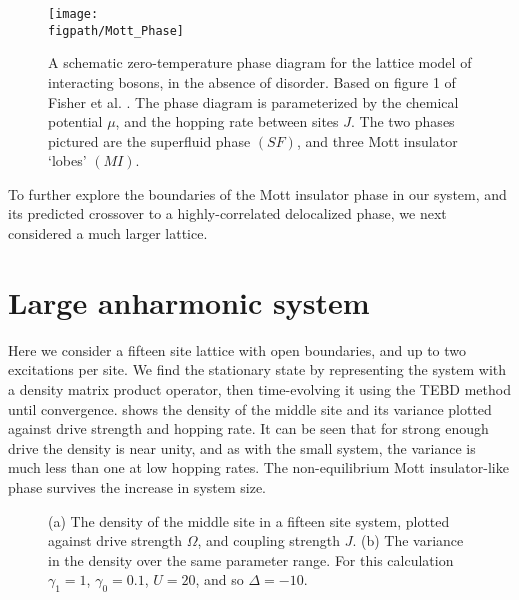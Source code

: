 \begin{figure}[ht]
	\texttt{[image: \\figpath/Mott\_Phase]}
	\caption{\label{fig:dnlca3-2}A schematic zero-temperature phase diagram for the lattice model of interacting bosons, in the absence of disorder. Based on figure 1 of Fisher et al. \cite{Fisher1989}. The phase diagram is parameterized by the chemical potential \(\mu\), and the hopping rate between sites \(J\). The two phases pictured are the superfluid phase \((SF)\), and three Mott insulator `lobes' \((MI)\).}
\end{figure}

To further explore the boundaries of the Mott insulator phase in our system, and its predicted crossover to a highly-correlated delocalized phase, we next considered a much larger lattice.

\section{Large anharmonic system}

Here we consider a fifteen site lattice with open boundaries, and up to two excitations per site. We find the stationary state by representing the system with a density matrix product operator, then time-evolving it using the TEBD method \cite{Vidal2004} until convergence.  shows the density of the middle site and its variance plotted against drive strength and hopping rate. It can be seen that for strong enough drive the density is near unity, and as with the small system, the variance is much less than one at low hopping rates. The non-equilibrium Mott insulator-like phase survives the increase in system size.

\begin{figure}[ht]
	 \hfill
	\caption{\label{fig:dnlca4-1} (a) The density of the middle site in a fifteen site system, plotted against drive strength \(\Omega\), and coupling strength \(J\). (b) The variance in the density over the same parameter range. For this calculation \(\gamma_{1} = 1\), \(\gamma_{0} = 0.1\), \(U = 20\), and so \(\Delta = -10\).}
\end{figure}


